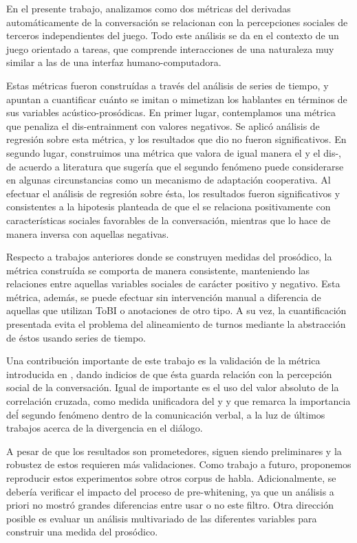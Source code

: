 En el presente trabajo, analizamos como dos métricas del \entrainment derivadas automáticamente de la conversación se relacionan con la percepciones sociales de terceros independientes del juego. Todo este análisis se da en el contexto de un juego orientado a tareas, que comprende interacciones de una naturaleza muy similar a las de una interfaz humano-computadora.

Estas métricas fueron construídas a través del análisis de series de tiempo, y apuntan a cuantificar cuánto se imitan o mimetizan los hablantes en términos de sus variables acústico-prosódicas. En primer lugar, contemplamos una métrica que penaliza el dis-entrainment con valores negativos. Se aplicó análisis de regresión sobre esta métrica, y los resultados que dio no fueron significativos. En segundo lugar, construimos una métrica que valora de igual manera el \entrainment y el dis-\entrainment, de acuerdo a literatura que sugería que el segundo fenómeno puede considerarse en algunas circunstancias como un mecanismo de adaptación cooperativa. Al efectuar el análisis de regresión sobre ésta, los resultados fueron significativos y consistentes a la hipotesis planteada de que el \entrainment se relaciona positivamente con características sociales favorables de la conversación, mientras que lo hace de manera inversa con aquellas negativas.

Respecto a trabajos anteriores donde se construyen medidas del \entrainment prosódico, la métrica construída se comporta de manera consistente, manteniendo las relaciones entre aquellas variables sociales de carácter positivo y negativo. Esta métrica, además, se puede efectuar sin intervención manual a diferencia de aquellas que utilizan ToBI o anotaciones de otro tipo. A su vez, la cuantificación presentada evita el problema del alineamiento de turnos mediante la abstracción de éstos usando series de tiempo.

Una contribución importante de este trabajo es la validación de la métrica introducida en \cite{KOU2008.2}, dando indicios de que ésta guarda relación con la percepción social de la conversación. Igual de importante es el uso del valor absoluto de la correlación cruzada, como medida unificadora del \entrainment y \disentrainment y que remarca la importancia deĺ segundo fenómeno dentro de la comunicación verbal, a la luz de últimos trabajos acerca de la divergencia en el diálogo.

A pesar de que los resultados son prometedores, siguen siendo preliminares y la robustez de estos requieren más validaciones. Como trabajo a futuro, proponemos reproducir estos experimentos sobre otros corpus de habla. Adicionalmente, se debería verificar el impacto del proceso de pre-whitening, ya que un análisis a priori no mostró grandes diferencias entre usar o no este filtro. Otra dirección posible es evaluar un análisis multivariado de las diferentes variables \ap para construir una medida del \entrainment prosódico.
